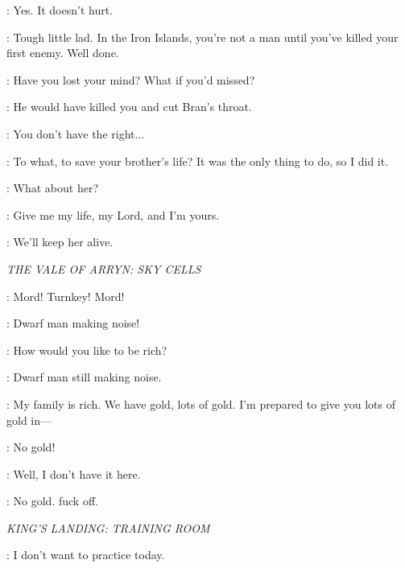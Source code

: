 \BRAN: Yes. It doesn't hurt. 

\THEON: Tough little lad. In the Iron Islands, you're not a man until you've killed your first enemy. Well done. 

\ROBB: Have you lost your mind? What if you'd missed? 

\THEON: He would have killed you and cut Bran's throat. 

\ROBB: You don't have the right$\ldots$ 

\THEON: To what, to save your brother's life? It was the only thing to do, so I did it. 

\ROBB: What about her? 

\OSHA: Give me my life, my Lord, and I'm yours. 

\ROBB: We'll keep her alive. 


\scene

\textit{THE VALE OF ARRYN: SKY CELLS} 


\TYRION: Mord! Turnkey! Mord! 


\MORD: Dwarf man making noise! 


\TYRION: How would you like to be rich? 

\MORD:  Dwarf man still making noise. 

\TYRION: My family is rich. We have gold, lots of gold. I'm prepared to give you lots of gold in--- 


\MORD: No gold! 

\TYRION: Well, I don't have it here. 

\MORD:  No gold. fuck off. 



\scene

\textit{KING'S LANDING: TRAINING ROOM} 


\ARYA: I don't want to practice today. 

